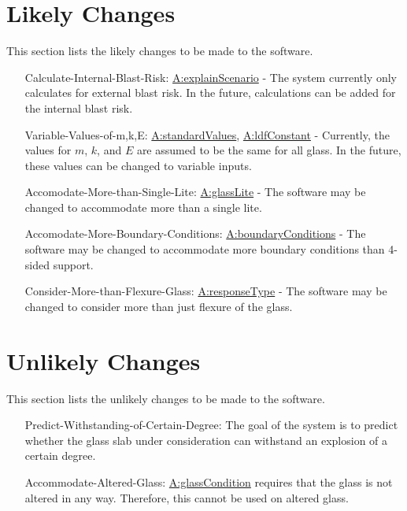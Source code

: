 \documentclass[12pt]{article}
\begin{document}
\section{Likely Changes}
\label{Sec:LCs}
This section lists the likely changes to be made to the software.

\begin{itemize}
\item[Calculate-Internal-Blast-Risk:\phantomsection\label{calcInternalBlastRisk}]{\hyperref[assumpES]{A:explainScenario} - The system currently only calculates for external blast risk. In the future, calculations can be added for the internal blast risk.}
\item[Variable-Values-of-m,k,E:\phantomsection\label{varValsOfmkE}]{\hyperref[assumpSV]{A:standardValues}, \hyperref[assumpLDFC]{A:ldfConstant} - Currently, the values for $m$, $k$, and $E$ are assumed to be the same for all glass. In the future, these values can be changed to variable inputs.}
\item[Accomodate-More-than-Single-Lite:\phantomsection\label{accMoreThanSingleLite}]{\hyperref[assumpGL]{A:glassLite} - The software may be changed to accommodate more than a single lite.}
\item[Accomodate-More-Boundary-Conditions:\phantomsection\label{accMoreBoundaryConditions}]{\hyperref[assumpBC]{A:boundaryConditions} - The software may be changed to accommodate more boundary conditions than 4-sided support.}
\item[Consider-More-than-Flexure-Glass:\phantomsection\label{considerMoreThanFlexGlass}]{\hyperref[assumpRT]{A:responseType} - The software may be changed to consider more than just flexure of the glass.}
\end{itemize}
\section{Unlikely Changes}
\label{Sec:UCs}
This section lists the unlikely changes to be made to the software.

\begin{itemize}
\item[Predict-Withstanding-of-Certain-Degree:\phantomsection\label{predictWithstandOfCertDeg}]{The goal of the system is to predict whether the glass slab under consideration can withstand an explosion of a certain degree.}
\item[Accommodate-Altered-Glass:\phantomsection\label{accAlteredGlass}]{\hyperref[assumpGC]{A:glassCondition} requires that the glass is not altered in any way. Therefore, this cannot be used on altered glass.}
\end{itemize}
\end{document}
